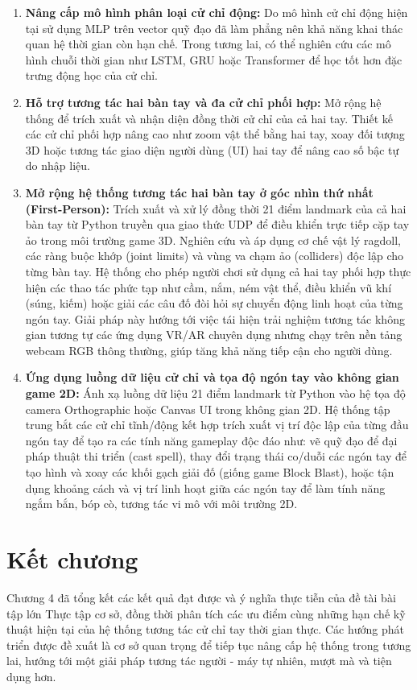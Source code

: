 \documentclass[../BTL.tex]{subfiles}
\begin{document}
\begin{enumerate}
    \item \textbf{Nâng cấp mô hình phân loại cử chỉ động:} Do mô hình cử chỉ động hiện tại sử dụng MLP trên vector quỹ đạo đã làm phẳng nên khả năng khai thác quan hệ thời gian còn hạn chế. Trong tương lai, có thể nghiên cứu các mô hình chuỗi thời gian như LSTM, GRU hoặc Transformer để học tốt hơn đặc trưng động học của cử chỉ.
    \item \textbf{Hỗ trợ tương tác hai bàn tay và đa cử chỉ phối hợp:} Mở rộng hệ thống để trích xuất và nhận diện đồng thời cử chỉ của cả hai tay. Thiết kế các cử chỉ phối hợp nâng cao như zoom vật thể bằng hai tay, xoay đối tượng 3D hoặc tương tác giao diện người dùng (UI) hai tay để nâng cao số bậc tự do nhập liệu.
    \item \textbf{Mở rộng hệ thống tương tác hai bàn tay ở góc nhìn thứ nhất (First-Person):} Trích xuất và xử lý đồng thời 21 điểm landmark của cả hai bàn tay từ Python truyền qua giao thức UDP để điều khiển trực tiếp cặp tay ảo trong môi trường game 3D. Nghiên cứu và áp dụng cơ chế vật lý ragdoll, các ràng buộc khớp (joint limits) và vùng va chạm ảo (colliders) độc lập cho từng bàn tay. Hệ thống cho phép người chơi sử dụng cả hai tay phối hợp thực hiện các thao tác phức tạp như cầm, nắm, ném vật thể, điều khiển vũ khí (súng, kiếm) hoặc giải các câu đố đòi hỏi sự chuyển động linh hoạt của từng ngón tay. Giải pháp này hướng tới việc tái hiện trải nghiệm tương tác không gian tương tự các ứng dụng VR/AR chuyên dụng nhưng chạy trên nền tảng webcam RGB thông thường, giúp tăng khả năng tiếp cận cho người dùng.
    \item \textbf{Ứng dụng luồng dữ liệu cử chỉ và tọa độ ngón tay vào không gian game 2D:} Ánh xạ luồng dữ liệu 21 điểm landmark từ Python vào hệ tọa độ camera Orthographic hoặc Canvas UI trong không gian 2D. Hệ thống tập trung bắt các cử chỉ tĩnh/động kết hợp trích xuất vị trí độc lập của từng đầu ngón tay để tạo ra các tính năng gameplay độc đáo như: vẽ quỹ đạo để đại pháp thuật thi triển (cast spell), thay đổi trạng thái co/duỗi các ngón tay để tạo hình và xoay các khối gạch giải đố (giống game Block Blast), hoặc tận dụng khoảng cách và vị trí linh hoạt giữa các ngón tay để làm tính năng ngắm bắn, bóp cò, tương tác vi mô với môi trường 2D.
\end{enumerate}

\section*{Kết chương}
Chương 4 đã tổng kết các kết quả đạt được và ý nghĩa thực tiễn của đề tài bài tập lớn Thực tập cơ sở, đồng thời phân tích các ưu điểm cùng những hạn chế kỹ thuật hiện tại của hệ thống tương tác cử chỉ tay thời gian thực. Các hướng phát triển được đề xuất là cơ sở quan trọng để tiếp tục nâng cấp hệ thống trong tương lai, hướng tới một giải pháp tương tác người - máy tự nhiên, mượt mà và tiện dụng hơn.
\end{document}
